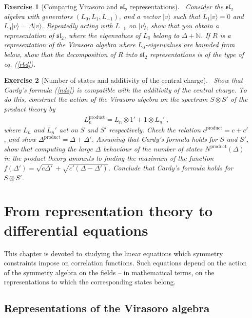 \documentclass[12pt,a4paper,notitlepage]{report}
\newcommand \N {\mathbb{N}}
\numberwithin{equation}{section}
\theoremstyle{break}
\newtheorem{exo}{Exercise}[chapter]
\begin{document}
\begin{exo}[Comparing Virasoro and $\mathfrak{sl}_2$ representations]
 ~\label{exodis}
Consider the $\mathfrak{sl}_2$ algebra with generators $(L_0,L_1,L_{-1})$, and a vector $|v\rangle$ such that $L_1|v\rangle = 0 $ and $L_0|v\rangle = \Delta |v\rangle$. Repeatedly acting with $L_{-1}$ on $|v\rangle$, show that you obtain a representation of $\mathfrak{sl}_2$, where the eigenvalues of $L_0$ belong to $\Delta+\N$. If $R$ is a representation of the Virasoro algebra where $L_0$-eigenvalues are bounded from below, show that the decomposition of $R$ into $\mathfrak{sl}_2$ representations is of the type of eq. (\ref{rbd}).
\end{exo}


\begin{exo}[Number of states and additivity of the central charge]
 ~\label{exoacf} 
Show that Cardy's formula (\ref{nds}) is compatible with the additivity of the central charge. To do this, construct the action of the Virasoro algebra on the spectrum $S\otimes S'$ of the product theory by 
\begin{align}
 L_n^\text{product} = L_n\otimes 1' + 1\otimes L_n'\ ,
\end{align}
where $L_n$ and $L_n'$ act on $S$ and $S'$ respectively. Check the relation $c^\text{product} = c+c'$, and show $\Delta^\text{product} = \Delta+\Delta'$.
Assuming that Cardy's formula holds for $S$ and $S'$, show that computing the large $\Delta$ behaviour of the number of states $N^\text{product}(\Delta)$ in the product theory amounts to finding the maximum of the function $f(\Delta') = \sqrt{c\Delta'} +\sqrt{c'(\Delta-\Delta')}$. Conclude that Cardy's formula holds for $S\otimes S'$.
\end{exo}


\chapter{From representation theory to differential equations \label{secccs}}

This chapter is devoted to studying the linear equations which symmetry constraints impose on correlation functions. Such equations depend on the action of the symmetry algebra on the fields -- in mathematical terms, on the representations to which the corresponding states belong. 

\section{Representations of the Virasoro algebra \label{secrep}}
\end{document}

